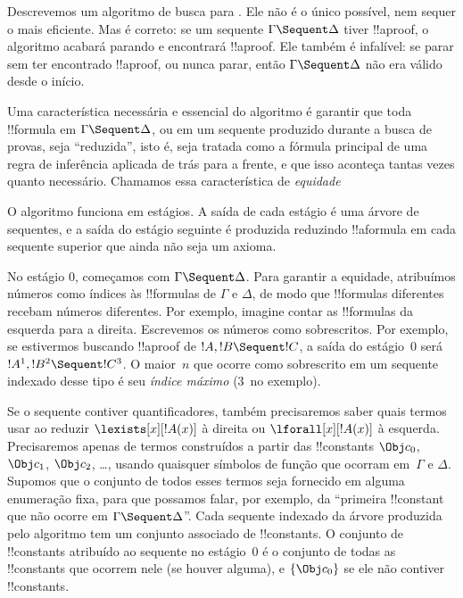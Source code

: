 \documentclass[../../../include/open-logic-section]{subfiles}
\begin{document}


Descrevemos um algoritmo de busca para . Ele não é o único
possível, nem sequer o mais eficiente. Mas é correto: se um sequente
$\Gamma \Sequent \Delta$ tiver !!a{proof}, o algoritmo acabará parando
e encontrará !!a{proof}. Ele também é infalível: se parar sem ter
encontrado !!a{proof}, ou nunca parar, então $\Gamma \Sequent \Delta$
não era válido desde o início.

Uma característica necessária e essencial do algoritmo é garantir que
toda !!{formula} em $\Gamma \Sequent \Delta$, ou em um sequente
produzido durante a busca de provas, seja ``reduzida'', isto é, seja
tratada como a fórmula principal de uma regra de inferência aplicada de
trás para a frente, e que isso aconteça tantas vezes quanto necessário.
Chamamos essa característica de \emph{equidade}

O algoritmo funciona em estágios. A saída de cada estágio é uma árvore
de sequentes, e a saída do estágio seguinte é produzida reduzindo
!!a{formula} em cada sequente superior que ainda não seja um axioma.

No estágio $0$, começamos com $\Gamma \Sequent \Delta$. Para garantir a
equidade, atribuímos números como índices às !!{formula}s de $\Gamma$ e
$\Delta$, de modo que !!{formula}s diferentes recebam números
diferentes. Por exemplo, imagine contar as !!{formula}s da esquerda
para a direita. Escrevemos os números como sobrescritos. Por exemplo,
se estivermos buscando !!a{proof} de $!A, !B \Sequent !C$, a saída do
estágio~$0$ será $!A^1, !B^2 \Sequent !C^3$. O maior~$n$ que ocorre
como sobrescrito em um sequente indexado desse tipo é seu \emph{índice
máximo} ($3$~no exemplo).

Se o sequente contiver quantificadores, também precisaremos saber quais
termos usar ao reduzir $\lexists[x][!A(x)]$ à direita ou
$\lforall[x][!A(x)]$ à esquerda. Precisaremos apenas de termos
construídos a partir das !!{constant}s $\Obj c_0$, $\Obj c_1$, $\Obj
c_2$, \dots, usando quaisquer símbolos de função que ocorram
em~$\Gamma$ e $\Delta$. Supomos que o conjunto de todos esses termos
seja fornecido em alguma enumeração fixa, para que possamos falar, por
exemplo, da ``primeira !!{constant} que não ocorre em $\Gamma \Sequent
\Delta$''. Cada sequente indexado da árvore produzida pelo algoritmo tem
um conjunto associado de !!{constant}s. O conjunto de !!{constant}s
atribuído ao sequente no estágio~$0$ é o conjunto de todas as
!!{constant}s que ocorrem nele (se houver alguma), e $\{\Obj c_0\}$ se
ele não contiver !!{constant}s.
\end{document}
